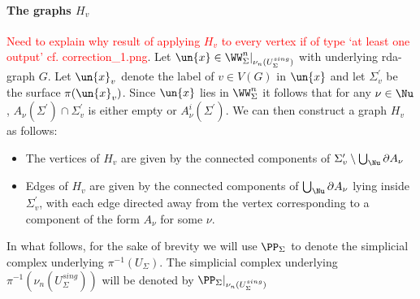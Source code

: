 \documentclass[a4paper,10pt]{amsart}
\begin{document}
	\paragraph{\textbf{The graphs $H_v$}}\label{hvgrph}\textcolor{red}{Need to explain why result of applying $H_v$ to every vertex if of type `at least one output' cf. correction\_1.png}. Let $\un{x} \in \WW^{n}_{\Sigma}|_{\nu_n(U_{\Sigma}^{sing})}$ with underlying rda-graph $G$. Let $\un{x}_v$ denote the label of $v \in V(G)$ in $\un{x}$ and let $\Sigma^{\prime}_v$ be the surface $\pi(\un{x}_v)$. Since $\un{x}$ lies in $\WW^{n}_{\Sigma}$ it follows that for any $\nu \in \Nu$, $A_{\nu}(\Sigma^{\prime}) \cap \Sigma^{\prime}_v$ is either empty or $A_{\nu}^i(\Sigma^{\prime})$. We can then construct a graph $H_v$ as follows:
		\begin{itemize}
			\item The vertices of $H_v$ are given by the connected components of $\Sigma^{\prime}_v \setminus \bigcup_{\Nu} \partial A_{\nu}$
			\item Edges of $H_v$ are given by the connected components of $\bigcup_{\Nu} \partial A_{\nu}$ lying inside $\Sigma^{\prime}_v$, with each edge directed away from the vertex corresponding to a component of the form $A_{\nu}$ for some $\nu$.
		\end{itemize}
\begin{notation}
In what follows, for the sake of brevity we will use $\PP_{\Sigma}$ to denote the simplicial complex underlying $\pi^{-1}(U_{\Sigma})$. The simplicial complex underlying $\pi^{-1}(\nu_n(U_{\Sigma}^{sing}))$ will be denoted by $\PP_{\Sigma}|_{\nu_n(U_{\Sigma}^{sing})}$
\end{notation}
\end{document}
